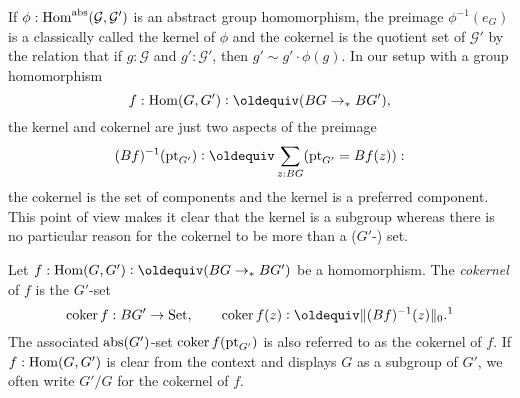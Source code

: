 \label{subsec:ker}
If $\phi:\mathrm{Hom}^{\mathrm{abs}}(\mathcal G,\mathcal G')$ is an abstract group homomorphism, the preimage $\phi^{-1}(e_G)$ is a classically called the kernel of $\phi$ and the cokernel is the quotient set of $\mathcal G'$ by the relation that if $g:\mathcal G$ and $g':\mathcal G'$, then $g'\sim g'\cdot\phi(g)$.  
In our setup with a group homomorphism 
$$f:\Hom(G,G')\defequi(BG\to_*BG'),$$ the kernel and cokernel are just two aspects of the preimage 
$$(Bf)^{-1}(\pt_{G'})\defequi\sum_{z:BG}(\pt_{G'}=Bf(z)):$$
 the cokernel is the set of components and the kernel is a preferred component.  This point of view makes it clear that the kernel is a subgroup whereas there is no particular reason for the cokernel to be more than a ($G'$-) set.
\newcommand{\coker}{\mathrm{coker}\,}
\newcommand{\image}{\mathrm{im}\,}
\begin{definition}
  \label{def:cokernel}
  Let $f:\Hom(G,G')\defequi(BG\to_*BG')$  be a homomorphism. %
The \emph{cokernel} of $f$ is the $G'$-set
\[
  \coker f:BG'\to\Set,\qquad \coker f(z)\defequi  \Trunc{(Bf)^{-1}(z)}_0.\text{\footnotemark}
\]
The associated $\mathrm{abs}(G')$-set $\coker f(\pt_{G'})$ is also referred to as the cokernel of $f$.  If $f:\mathrm{Hom}(G,G')$ is clear from the context and displays $G$ as a subgroup of $G'$, we often write $G'/G$ for the cokernel of $f$.  

\end{definition}
